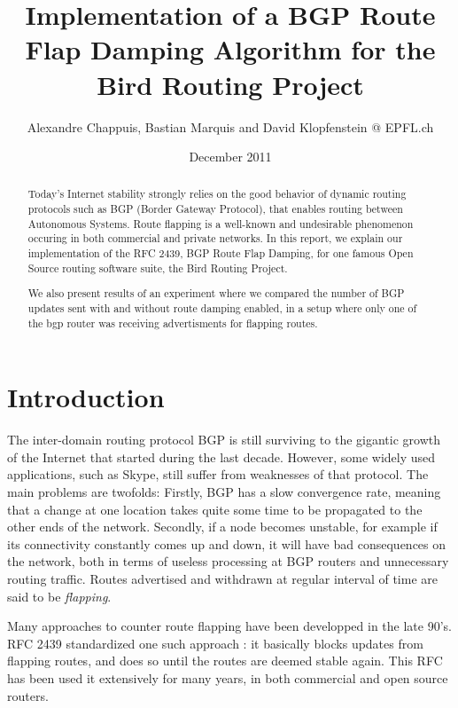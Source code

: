 \documentclass[a4paper,english]{IEEEtran}
\begin{document}
\date{December 2011}

\author{Alexandre Chappuis, Bastian Marquis and David Klopfenstein @ EPFL.ch}

\title{Implementation of a BGP Route Flap Damping Algorithm for the Bird
Routing Project}
\maketitle
\begin{abstract}

Today's Internet stability strongly relies on the good behavior of
dynamic routing protocols such as BGP (Border Gateway Protocol),
that enables routing between Autonomous Systems. Route flapping is
a well-known and undesirable phenomenon occuring in both commercial
and private networks. In this report, we explain our implementation
of the RFC 2439, BGP Route Flap Damping, for one famous Open Source
routing software suite, the Bird Routing Project.

\par

We also present results of an experiment where we compared the number of
BGP updates sent with and without route damping enabled, in a setup where only one of the bgp router was receiving advertisments for flapping routes.

\end{abstract}

\section{Introduction}

The inter-domain routing protocol BGP is still surviving to the gigantic
growth of the Internet that started during the last decade.
However, some widely used applications, such as Skype, still suffer from weaknesses
of that protocol.
The main problems are twofolds:
Firstly, BGP has a slow convergence rate, meaning that a change
at one location takes quite some time to be propagated to the other ends of 
the network. Secondly, if a node becomes unstable, for example if
its connectivity constantly comes up and down, it will have bad consequences
on the network, both in terms of useless processing at BGP routers and
unnecessary routing traffic. Routes advertised and withdrawn
at regular interval of time are said to be \textit{flapping}.

Many approaches to counter route flapping have been developped in the late 90's.
RFC 2439\cite{rfc2439} standardized one such approach : it basically blocks updates from flapping routes, and does so until the routes are deemed stable again.
This RFC has been used it extensively for many years, in both commercial and open source routers.
\end{document}
